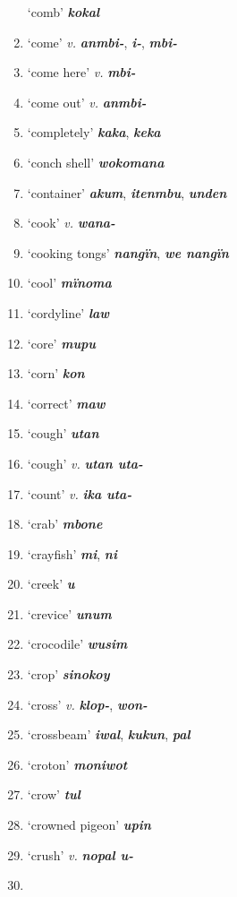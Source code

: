\begin{enumerate}[noitemsep, label={}, align=left, widest=190, labelsep=1ex,leftmargin=*,itemindent=-10pt]
‘comb’ \textbf{\textit{kokal}} \item
‘come’ \textit{v.} \textbf{\textit{anmbi-}}, \textbf{\textit{i-}}, \textbf{\textit{mbi-}} \item
‘come here’ \textit{v.} \textbf{\textit{mbi-}} \item
‘come out’ \textit{v.} \textbf{\textit{anmbi-}} \item
‘completely’ \textbf{\textit{kaka}}, \textbf{\textit{keka}} \item
‘conch shell’ \textbf{\textit{wokomana}} \item
‘container’ \textbf{\textit{akum}}, \textbf{\textit{itenmbu}}, \textbf{\textit{unden}} \item
‘cook’ \textit{v.} \textbf{\textit{wana-}} \item
‘cooking tongs’ \textbf{\textit{nangïn}}, \textbf{\textit{we nangïn}} \item
‘cool’ \textbf{\textit{mïnoma}} \item
‘cordyline’ \textbf{\textit{law}} \item
‘core’ \textbf{\textit{mupu}} \item
‘corn’ \textbf{\textit{kon}} \item
‘correct’ \textbf{\textit{maw}} \item
‘cough’ \textbf{\textit{utan}} \item
‘cough’ \textit{v.} \textbf{\textit{utan uta-}} \item
‘count’ \textit{v.} \textbf{\textit{ika uta-}} \item
‘crab’ \textbf{\textit{mbone}} \item
‘crayfish’ \textbf{\textit{mi}}, \textbf{\textit{ni}} \item
‘creek’ \textbf{\textit{u}} \item
‘crevice’ \textbf{\textit{unum}} \item
‘crocodile’ \textbf{\textit{wusim}} \item
‘crop’ \textbf{\textit{sinokoy}} \item
‘cross’ \textit{v.} \textbf{\textit{klop-}}, \textbf{\textit{won-}} \item
‘crossbeam’ \textbf{\textit{iwal}}, \textbf{\textit{kukun}}, \textbf{\textit{pal}} \item
‘croton’ \textbf{\textit{moniwot}} \item
‘crow’ \textbf{\textit{tul}} \item
‘crowned pigeon’ \textbf{\textit{upin}} \item
‘crush’ \textit{v.} \textbf{\textit{nopal u-}} \item

\end{enumerate}
